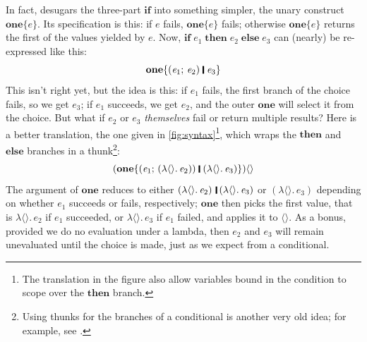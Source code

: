 \documentclass[acmsmall]{acmart}
\newcommand{\Varid}[1]{\mathit{#1}}
\begin{document}
In fact, \versecalc{} desugars the three-part \ensuremath{\textbf{if}} into something simpler, the unary construct \ensuremath{\textbf{one}\{\Varid{e}\}}.
Its specification is this:
if \ensuremath{\Varid{e}} fails, \ensuremath{\textbf{one}\{\Varid{e}\}} fails; otherwise \ensuremath{\textbf{one}\{\Varid{e}\}} returns the first of the values yielded by \ensuremath{\Varid{e}}.
Now, \ensuremath{\textbf{if}\;\Varid{e}_{\mathrm{1}}\;\textbf{then}\;\Varid{e}_{\mathrm{2}}\;\textbf{else}\;\Varid{e}_{\mathrm{3}}} can (nearly) be re-expressed like this:
$$
\ensuremath{\textbf{one}\{(\Varid{e}_{\mathrm{1}};\,\Varid{e}_{\mathrm{2}})\;\rule[-0.1em]{0.15em}{0.75em}\;\Varid{e}_{\mathrm{3}}\}}
$$
This isn't right yet, but the idea is this: if \ensuremath{\Varid{e}_{\mathrm{1}}} fails, the first branch of the choice fails, so we get \ensuremath{\Varid{e}_{\mathrm{3}}}; if \ensuremath{\Varid{e}_{\mathrm{1}}} succeeds, we
get \ensuremath{\Varid{e}_{\mathrm{2}}}, and the outer \ensuremath{\textbf{one}} will select it from the choice.
But what if \ensuremath{\Varid{e}_{\mathrm{2}}} or \ensuremath{\Varid{e}_{\mathrm{3}}} \emph{themselves} fail or return multiple results?  Here is a better translation,
the one given in \cref{fig:syntax}\footnote{The translation in the figure also allow variables bound in the condition to scope over the \ensuremath{\textbf{then}} branch.}, which wraps the \ensuremath{\textbf{then}} and \ensuremath{\textbf{else}} branches
in a thunk\footnote{Using thunks for the branches of a conditional is another very old idea;
for example, see \cite[p.\ 54]{steele:rabbit}.}:
$$
\ensuremath{(\textbf{one}\{(\Varid{e}_{\mathrm{1}};\,(\lambda \langle\rangle.\,\Varid{e}_{\mathrm{2}}))\;\rule[-0.1em]{0.15em}{0.75em}\;(\lambda \langle\rangle.\,\Varid{e}_{\mathrm{3}})\})\langle\rangle}
$$
The argument of \ensuremath{\textbf{one}} reduces to either \ensuremath{(\lambda \langle\rangle.\,\Varid{e}_{\mathrm{2}})\hspace{0.2em}\mathop{\rule[-0.1em]{0.15em}{0.75em}}\hspace{0.2em}(\lambda \langle\rangle.\,\Varid{e}_{\mathrm{3}})} or \ensuremath{(\lambda \langle\rangle.\,\Varid{e}_{\mathrm{3}})} depending on whether \ensuremath{\Varid{e}_{\mathrm{1}}} succeeds or fails,
respectively; \ensuremath{\textbf{one}} then picks the first value, that is \ensuremath{\lambda \langle\rangle.\,\Varid{e}_{\mathrm{2}}} if \ensuremath{\Varid{e}_{\mathrm{1}}} succeeded, or \ensuremath{\lambda \langle\rangle.\,\Varid{e}_{\mathrm{3}}} if \ensuremath{\Varid{e}_{\mathrm{1}}} failed, and
applies it to \ensuremath{\langle{}\rangle}.
As a bonus, provided we do no evaluation under a lambda, then \ensuremath{\Varid{e}_{\mathrm{2}}} and \ensuremath{\Varid{e}_{\mathrm{3}}} will
remain unevaluated until the choice is made, just as we expect from a conditional.
\end{document}
